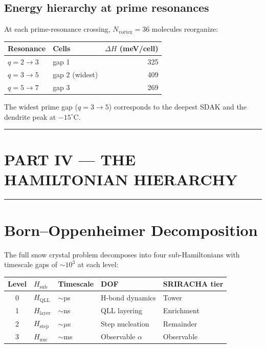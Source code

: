 \documentclass[11pt,a4paper]{article}
\begin{document}
\subsection{Energy hierarchy at prime resonances}
At each prime-resonance crossing, $N_\text{vortex} = 36$ molecules reorganize:
\begin{center}\small
\begin{tabular}{llr}
\toprule
Resonance & Cells & $\Delta H$ (meV/cell) \\
\midrule
$q = 2 \to 3$ & gap 1 & 325 \\
$q = 3 \to 5$ & gap 2 (widest) & 409 \\
$q = 5 \to 7$ & gap 3 & 269 \\
\bottomrule
\end{tabular}
\end{center}
The widest prime gap ($q=3 \to 5$) corresponds to the deepest SDAK and the dendrite peak at $-15^\circ$C.

\hrule\vspace{14pt}

\section*{\centering PART IV — THE HAMILTONIAN HIERARCHY}
\hrule\vspace{12pt}

\section{Born–Oppenheimer Decomposition}
\label{sec:hamiltonian}

The full snow crystal problem decomposes into four sub-Hamiltonians with timescale gaps of $\sim 10^3$ at each level:

\begin{center}\small
\begin{tabular}{cllll}
\toprule
Level & $H_\text{sub}$ & Timescale & DOF & SRIRACHA tier\\
\midrule
0 & $H_\text{QLL}$  & $\sim$ps & H-bond dynamics    & Tower      \\
1 & $H_\text{layer}$& $\sim$ns & QLL layering       & Enrichment \\
2 & $H_\text{step}$ & $\sim\mu$s & Step nucleation  & Remainder  \\
3 & $H_\text{nuc}$  & $\sim$ms & Observable $\alpha$ & Observable\\
\bottomrule
\end{tabular}
\end{center}
\end{document}
